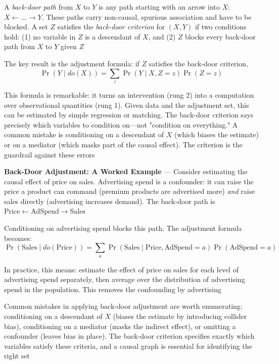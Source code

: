 A \emph{back-door path} from $X$ to $Y$ is any path starting with an arrow into
$X$: $X \leftarrow \ldots \rightarrow Y$. These paths carry non-causal, spurious
association and have to be blocked. A set $Z$ satisfies the \emph{back-door
criterion} for $(X, Y)$ if two conditions hold: (1) no variable in $Z$ is a
descendant of $X$, and (2) $Z$ blocks every back-door path from $X$ to $Y$ given
$Z$

The key result is the adjustment formula: if $Z$ satisfies the back-door criterion,
\begin{equation}
  \Pr(Y \mid do(X)) = \sum_{z}\Pr(Y \mid X, Z = z) \Pr(Z = z) \label{eq:backdoor-adjustment}
\end{equation}

This formula is remarkable: it turns an intervention (rung 2) into a computation
over observational quantities (rung 1). Given data and the adjustment set, this
can be estimated by simple regression or matching. The back-door criterion says precisely
which variables to condition on—not "condition on everything." A common mistake
is conditioning on a descendant of $X$ (which biases the estimate) or on a
mediator (which masks part of the causal effect). The criterion is the guardrail
against these errors

\textbf{Back-Door Adjustment: A Worked Example} --- Consider estimating the causal
effect of price on sales. Advertising spend is a confounder: it can raise the price
a product can command (premium products are advertised more) \emph{and} raise
sales directly (advertising increases demand). The back-door path is $\text{Price}
\leftarrow \text{AdSpend}\to \text{Sales}$

Conditioning on advertising spend blocks this path. The adjustment formula becomes:
\begin{equation}
  \Pr(\text{Sales}\mid do(\text{Price})) = \sum_{a}\Pr(\text{Sales}\mid \text{Price}
  , \text{AdSpend}= a) \Pr(\text{AdSpend}= a) \label{eq:price-sales-adjustment}
\end{equation}

In practice, this means: estimate the effect of price on sales for each level of
advertising spend separately, then average over the distribution of advertising
spend in the population. This removes the confounding by advertising

Common mistakes in applying back-door adjustment are worth enumerating: conditioning
on a descendant of $X$ (biases the estimate by introducing collider bias),
conditioning on a mediator (masks the indirect effect), or omitting a confounder
(leaves bias in place). The back-door criterion specifies exactly which
variables satisfy these criteria, and a causal graph is essential for identifying
the right set

